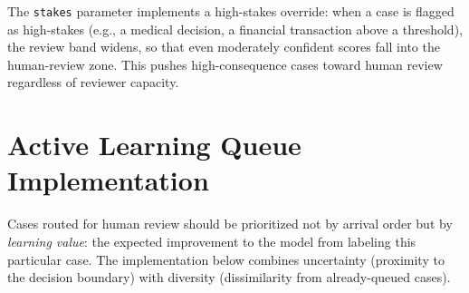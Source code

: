 \begin{examplebox}
The \texttt{stakes} parameter implements a high-stakes override: when a case is flagged as high-stakes (e.g., a medical decision, a financial transaction above a threshold), the review band widens, so that even moderately confident scores fall into the human-review zone. This pushes high-consequence cases toward human review regardless of reviewer capacity.
\end{examplebox}

\section{Active Learning Queue Implementation}

Cases routed for human review should be prioritized not by arrival order but by \emph{learning value}: the expected improvement to the model from labeling this particular case. The implementation below combines uncertainty (proximity to the decision boundary) with diversity (dissimilarity from already-queued cases).

